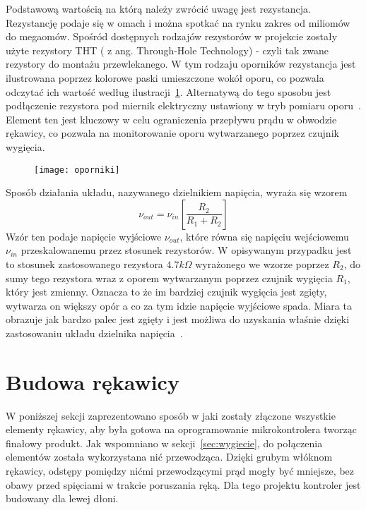 	Podstawową wartością na którą należy zwrócić uwagę jest rezystancja. Rezystancję podaje się w omach i można spotkać na rynku zakres od miliomów do megaomów. Spośród dostępnych rodzajów rezystorów w projekcie zostały użyte rezystory THT ( z ang. Through-Hole Technology) - czyli tak zwane rezystory do montażu przewlekanego. W tym rodzaju oporników rezystancja jest ilustrowana poprzez kolorowe paski umieszczone wokół oporu, co pozwala odczytać ich wartość według ilustracji~\ref{fig:oporniki}. Alternatywą do tego sposobu jest podłączenie rezystora pod miernik elektryczny ustawiony w tryb pomiaru oporu~\cite{rezystor}. Element ten jest kluczowy w celu ograniczenia przepływu prądu w obwodzie rękawicy, co pozwala na monitorowanie oporu wytwarzanego poprzez czujnik wygięcia.
		
\begin{figure}[h]
\centering
\texttt{[image: oporniki]}
\label{fig:oporniki}
\end{figure}
	
Sposób działania układu, nazywanego dzielnikiem napięcia, wyraża się wzorem
	$$
		\nu_{out} = \nu_{in}\left[ \frac{R_2}{R_1+R_2}\right]
	$$	
Wzór ten podaje napięcie wyjściowe $\nu_{out}$, które równa się napięciu wejściowemu $\nu_{in}$ przeskalowanemu przez stosunek rezystorów. W opisywanym przypadku jest to stosunek zastosowanego rezystora $4.7 k\Omega$ wyrażonego we wzorze poprzez $R_2$, do sumy tego rezystora wraz z oporem wytwarzanym poprzez czujnik wygięcia $R_1$, który jest zmienny. Oznacza to że im bardziej czujnik wygięcia jest zgięty, wytwarza on większy opór a co za tym idzie napięcie wyjściowe spada. Miara ta obrazuje jak bardzo palec jest zgięty i jest możliwa do uzyskania właśnie dzięki zastosowaniu układu dzielnika napięcia~\cite{v-divider}.


\section{Budowa rękawicy}
\label{sec:budowa}

W poniższej sekcji zaprezentowano sposób w jaki zostały złączone wszystkie elementy rękawicy, aby była gotowa na oprogramowanie mikrokontrolera tworząc finałowy produkt. Jak wspomniano w sekcji~\ref{sec:wygiecie}, do połączenia elementów została wykorzystana nić przewodząca. Dzięki grubym włóknom rękawicy, odstępy pomiędzy nićmi przewodzącymi prąd mogły być mniejsze, bez obawy przed spięciami w trakcie poruszania ręką. Dla tego projektu kontroler jest budowany dla lewej dłoni.

